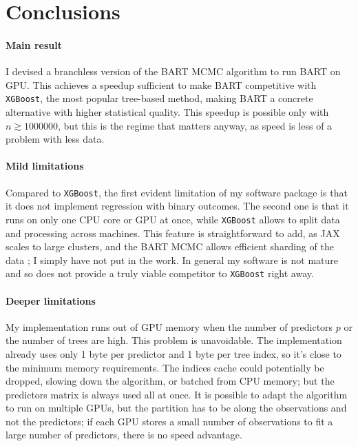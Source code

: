 \documentclass{article}
\begin{document}
    \section{Conclusions}

    \paragraph{Main result}

    I devised a branchless version of the BART MCMC algorithm to run BART on GPU. This achieves a speedup sufficient to make BART competitive with \texttt{XGBoost}, the most popular tree-based method, making BART a concrete alternative with higher statistical quality. This speedup is possible only with $n\gtrsim\num{1000000}$, but this is the regime that matters anyway, as speed is less of a problem with less data.

    \paragraph{Mild limitations}

    Compared to \texttt{XGBoost}, the first evident limitation of my software package is that it does not implement regression with binary outcomes. The second one is that it runs on only one CPU core or GPU at once, while \texttt{XGBoost} allows to split data and processing across machines. This feature is straightforward to add, as JAX scales to large clusters, and the BART MCMC allows efficient sharding of the data \autocite{pratola2014}; I simply have not put in the work. In general my software is not mature and so does not provide a truly viable competitor to \texttt{XGBoost} right away.

    \paragraph{Deeper limitations}

    My implementation runs out of GPU memory when the number of predictors $p$ or the number of trees are high. This problem is unavoidable. The implementation already uses only 1 byte per predictor and 1 byte per tree index, so it's close to the minimum memory requirements. The indices cache could potentially be dropped, slowing down the algorithm, or batched from CPU memory; but the predictors matrix is always used all at once. It is possible to adapt the algorithm to run on multiple GPUs, but the partition has to be along the observations and not the predictors; if each GPU stores a small number of observations to fit a large number of predictors, there is no speed advantage.
\end{document}
